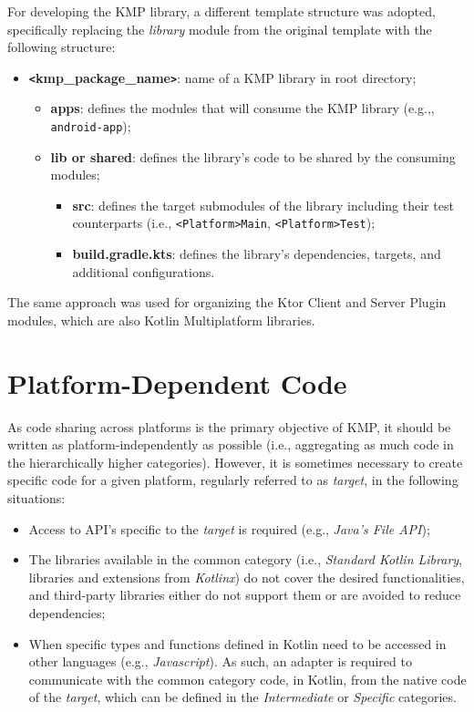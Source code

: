 For developing the KMP library, a different template structure was adopted, specifically replacing the \textit{library} module from the original template with the following structure:

\begin{itemize}
    \item \textbf{\texttt{<}kmp\_package\_name\texttt{>}}: name of a KMP library in root directory;
    \begin{itemize}
        \item \textbf{apps}: defines the modules that will consume the KMP library (e.g.,, \texttt{android-app});
        \item \textbf{lib or shared}: defines the library's code to be shared by the consuming modules;
        \begin{itemize}
            \item \textbf{src}: defines the target submodules of the library including their test counterparts (i.e., \texttt{<Platform>Main}, \texttt{<Platform>Test});
            \item \textbf{build.gradle.kts}: defines the library's dependencies, targets, and additional configurations.
        \end{itemize}
    \end{itemize}
\end{itemize}

The same approach was used for organizing the Ktor Client and Server Plugin modules, which are also Kotlin Multiplatform libraries.


\section{Platform-Dependent Code}\label{sec:platform-dependent-code}

As code sharing across platforms is the primary objective of KMP, it should be written as platform-independently as possible (i.e., aggregating as much code in the hierarchically higher categories).
However, it is sometimes necessary to create specific code for a given platform, regularly referred to as \textit{target}, in the following situations:

\begin{itemize}
    \item Access to API's specific to the \textit{target} is required (e.g., \textit{Java's File API});
    \item The libraries available in the common category (i.e., \textit{Standard Kotlin Library}, libraries and extensions from \textit{Kotlinx}) do not cover the desired functionalities, and third-party libraries either do not support them or are avoided to reduce dependencies;
    \item When specific types and functions defined in Kotlin need to be accessed in other languages (e.g., \textit{Javascript}).
    As such, an adapter is required to communicate with the common category code,
    in Kotlin, from the native code of the \textit{target}, which can be defined in the \textit{Intermediate} or \textit{Specific} categories.
\end{itemize}


